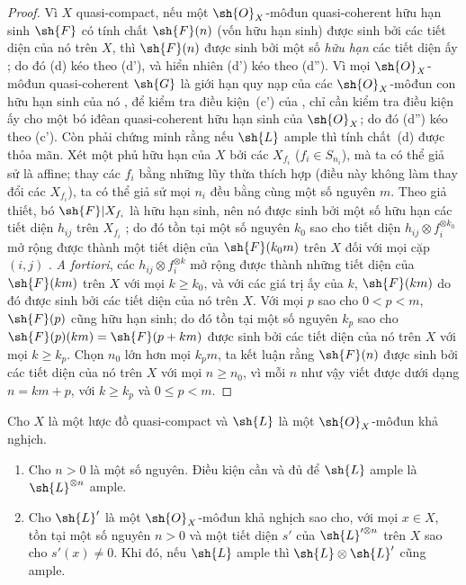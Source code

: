 \documentclass[oneside,10pt]{amsart}
\renewcommand{\leq}{\leqslant}
\renewcommand{\geq}{\geqslant}
\newcommand{\oldpage}[2][]{\marginnote{\normalfont\footnotesize\textbf{#1}~|~#2}\ignorespaces}
\let\EGAOriginalLabel\label
\renewcommand{\label}[1]{\phantomsection\EGAOriginalLabel{#1}}
\begin{document}
\begin{proof}
Vì $X$ quasi-compact, nếu một $\sh{O}_X$-môđun quasi-coherent hữu hạn sinh $\sh{F}$ có tính chất $\sh{F}(n)$ (vốn hữu hạn sinh) được sinh bởi các tiết diện của nó trên $X$, thì $\sh{F}(n)$ được sinh bởi một số \emph{hữu hạn} các tiết diện ấy ;
do đó (d) kéo theo (d'), và hiển nhiên (d') kéo theo (d'').
Vì mọi $\sh{O}_X$-môđun quasi-coherent $\sh{G}$ là giới hạn quy nạp của các $\sh{O}_X$-môđun con hữu hạn sinh của nó , để kiểm tra điều kiện~(c') của , chỉ cần kiểm tra điều kiện ấy cho một bó iđêan quasi-coherent hữu hạn sinh của $\sh{O}_X$; do đó (d'') kéo theo (c').
Còn phải chứng minh rằng nếu $\sh{L}$ ample thì tính chất~(d) được thỏa mãn.
Xét một phủ hữu hạn của $X$ bởi các $X_{f_i}$ ($f_i\in S_{n_i}$), mà ta có thể giả sử là affine;
thay các $f_i$ bằng những lũy thừa thích hợp (điều này không làm thay đổi các $X_{f_i}$), ta có thể giả sử mọi $n_i$ đều bằng cùng một số nguyên $m$.
Theo giả thiết, bó $\sh{F}|X_{f_i}$ là hữu hạn sinh, nên nó được sinh bởi một số hữu hạn các tiết diện $h_{ij}$ trên $X_{f_i}$ ;
do đó tồn tại một số nguyên $k_0$ sao cho tiết diện $h_{ij}\otimes f_i^{\otimes k_0}$ mở rộng được thành một tiết diện của $\sh{F}(k_0m)$ trên $X$ đối với mọi cặp $(i,j)$ .
\emph{A fortiori}, các $h_{ij}\otimes f_i^{\otimes k}$ mở rộng được thành những tiết diện của $\sh{F}(km)$ trên $X$ với mọi $k\geq k_0$, và với các giá trị ấy của $k$, $\sh{F}(km)$ do đó được sinh bởi các tiết diện của nó trên $X$.
Với mọi $p$ sao cho $0<p<m$, $\sh{F}(p)$ cũng hữu hạn sinh; do đó tồn tại một số nguyên $k_p$ sao cho $\sh{F}(p)(km)=\sh{F}(p+km)$ được sinh bởi các tiết diện của nó trên $X$ với mọi $k\geq k_p$.
Chọn $n_0$ lớn hơn mọi $k_pm$, ta kết luận rằng $\sh{F}(n)$ được sinh bởi các tiết diện của nó trên $X$ với mọi $n\geq n_0$, vì mỗi $n$ như vậy viết được dưới dạng $n=km+p$, với $k\geq k_p$ và $0\leq p<m$.
\end{proof}

\begin{proposition}[4.5.6]
\label{II.4.5.6}
Cho $X$ là một lược đồ quasi-compact và $\sh{L}$ là một $\sh{O}_X$-môđun khả nghịch.
\begin{enumerate}
  \item[\rm{(i)}] Cho $n>0$ là một số nguyên. Điều kiện cần và đủ để $\sh{L}$ ample là $\sh{L}^{\otimes n}$ ample.
  \item[\rm{(ii)}] Cho $\sh{L}'$ là một $\sh{O}_X$-môđun khả nghịch sao cho, với mọi $x\in X$, tồn tại một số nguyên $n>0$
\oldpage[II]{86}
    và một tiết diện $s'$ của $\sh{L}'^{\otimes n}$ trên $X$ sao cho $s'(x)\neq0$.
    Khi đó, nếu $\sh{L}$ ample thì $\sh{L}\otimes\sh{L}'$ cũng ample.
\end{enumerate}
\end{proposition}
\end{document}
